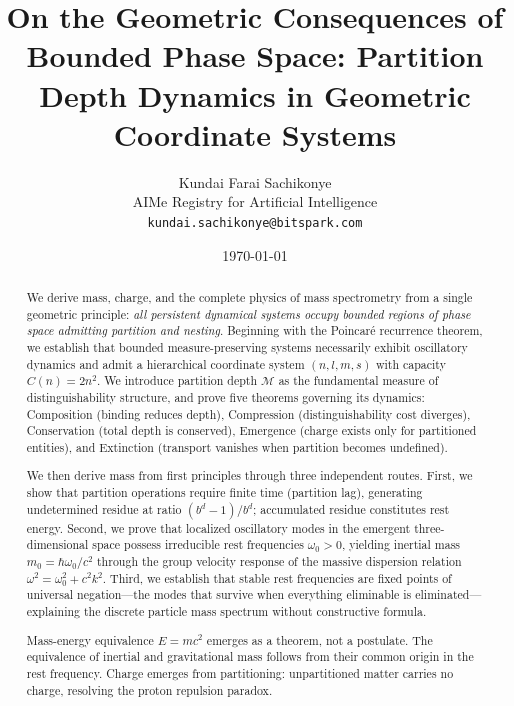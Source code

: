 \documentclass[twocolumn,10pt,a4paper]{article}
\theoremstyle{definition}
\theoremstyle{remark}
\newcommand{\Depth}{\mathcal{M}}
\begin{document}
\title{\textbf{On the Geometric Consequences of Bounded Phase Space: Partition Depth Dynamics in Geometric Coordinate Systems}}

\author{
Kundai Farai Sachikonye\\
AIMe Registry for Artificial Intelligence\\
\texttt{kundai.sachikonye@bitspark.com}
}

\date{\today}

\maketitle

\begin{abstract}
\noindent We derive mass, charge, and the complete physics of mass spectrometry from a single geometric principle: \emph{all persistent dynamical systems occupy bounded regions of phase space admitting partition and nesting}. Beginning with the Poincar\'{e} recurrence theorem, we establish that bounded measure-preserving systems necessarily exhibit oscillatory dynamics and admit a hierarchical coordinate system $(n, l, m, s)$ with capacity $C(n) = 2n^2$. We introduce partition depth $\Depth$ as the fundamental measure of distinguishability structure, and prove five theorems governing its dynamics: Composition (binding reduces depth), Compression (distinguishability cost diverges), Conservation (total depth is conserved), Emergence (charge exists only for partitioned entities), and Extinction (transport vanishes when partition becomes undefined).

We then derive mass from first principles through three independent routes. First, we show that partition operations require finite time (partition lag), generating undetermined residue at ratio $(b^d - 1)/b^d$; accumulated residue constitutes rest energy. Second, we prove that localized oscillatory modes in the emergent three-dimensional space possess irreducible rest frequencies $\omega_0 > 0$, yielding inertial mass $m_0 = \hbar\omega_0/c^2$ through the group velocity response of the massive dispersion relation $\omega^2 = \omega_0^2 + c^2k^2$. Third, we establish that stable rest frequencies are fixed points of universal negation---the modes that survive when everything eliminable is eliminated---explaining the discrete particle mass spectrum without constructive formula.

Mass-energy equivalence $E = mc^2$ emerges as a theorem, not a postulate. The equivalence of inertial and gravitational mass follows from their common origin in the rest frequency. Charge emerges from partitioning: unpartitioned matter carries no charge, resolving the proton repulsion paradox.


\end{abstract}
\end{document}
